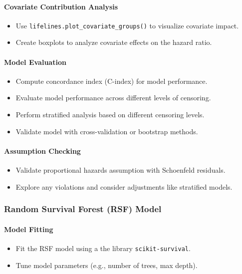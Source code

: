 \paragraph*{Covariate Contribution Analysis}
\begin{itemize}
    \item Use \texttt{lifelines.plot\_covariate\_groups()} to visualize covariate impact.
    \item Create boxplots to analyze covariate effects on the hazard ratio.
\end{itemize}

\paragraph*{Model Evaluation}
\begin{itemize}
    \item Compute concordance index (C-index) for model performance.
    \item Evaluate model performance across different levels of censoring.
    \item Perform stratified analysis based on different censoring levels.
    \item Validate model with cross-validation or bootstrap methods.
\end{itemize}

\paragraph*{Assumption Checking}
\begin{itemize}
    \item Validate proportional hazards assumption with Schoenfeld residuals.
    \item Explore any violations and consider adjustments like stratified models.
\end{itemize}

\subsubsection*{Random Survival Forest (RSF) Model}

\paragraph*{Model Fitting}
\begin{itemize}
    \item Fit the RSF model using a the library \texttt{scikit-survival}.
    \item Tune model parameters (e.g., number of trees, max depth).
\end{itemize}

